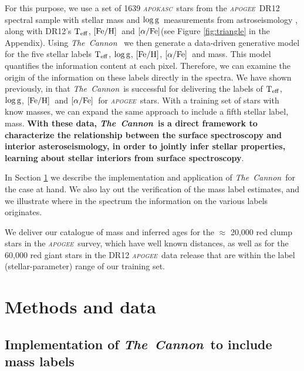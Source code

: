 \documentclass[12pt, preprint]{aastex}
\newcommand{\project}[1]{\textsl{#1}}
\newcommand{\tc}{\project{The~Cannon}}
\newcommand{\apogee}{\project{\textsc{apogee}}}
\newcommand{\apokasc}{\project{\textsc{apokasc}}}
\newcommand{\teff}{\mbox{$\rm T_{eff}$}}
\newcommand{\feh}{\mbox{$\rm [Fe/H]$}}
\newcommand{\alphafe}{\mbox{$\rm [\alpha/Fe]$}}
\newcommand{\logg}{\mbox{$\rm \log g$}}
\begin{document}
For this purpose, we use a set of 1639 \apokasc\ stars from the \apogee\ DR12 spectral sample with stellar mass and \logg\ measurements from astroseismology \citep{P2014}, along with DR12's  \teff, \feh\ and \alphafe (see Figure \ref{fig:triangle} in the Appendix).  Using \tc~ \citep{Ness2015} we then generate a data-driven generative model for the five stellar labels \teff, \logg, \feh, \alphafe\ and mass. This model quantifies the information content at each pixel.  
Therefore, we can examine the origin of the information on these labels directly in the spectra. We have shown previously, in  \citet[][and Ho et al., in prep]{Ness2015}   that \tc\ is successful for delivering the labels of \teff, \logg, \feh\  and \alphafe\ for \apogee\ stars. With a training set of stars with know masses, we can expand the same approach to include a fifth stellar label, mass. \textbf{With these data,  \tc\ is a direct framework to characterize the relationship between the surface spectroscopy and interior asteroseismology, in order to jointly infer stellar properties, learning about stellar interiors from surface spectroscopy}.

In Section \ref{sec:methods} we describe the implementation and application of \tc\ for the case at hand. We also lay out the verification of the mass label estimates, and we illustrate where in the spectrum the information on the various labels originates. 

We deliver our catalogue of mass and inferred ages for the $\approx$ 20,000 red clump stars in the \apogee\ survey, which have well known distances, as well as for the 60,000 red giant stars in the DR12 \apogee\ data release that are within the label (stellar-parameter) range of our training set.


\section{Methods and data}
\label{sec:methods}

\subsection{Implementation of \tc\ to include mass labels}
\end{document}
